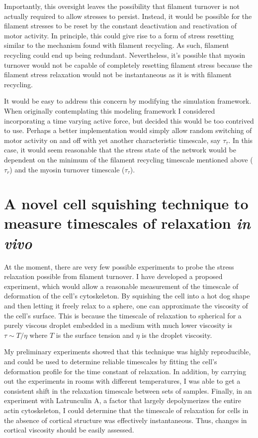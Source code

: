Importantly, this oversight leaves the possibility that filament turnover is not actually required to allow stresses to persist.  Instead, it would be possible for the filament stresses to be reset by the constant deactivation and reactivation of motor activity.  In principle, this could give rise to a form of stress resetting similar to the mechanism found with filament recycling.  As such, filament recycling could end up being redundant.  Nevertheless, it's possible that myosin turnover would not be capable of completely resetting filament stress because the filament stress relaxation would not be instantaneous as it is with filament recycling.

It would be easy to address this concern by modifying the simulation framework.  When originally contemplating this modeling framework I considered incorporating a time varying active force, but decided this would be too contrived to use.  Perhaps a better implementation would simply allow random switching of motor activity on and off with yet another characteristic timescale, say $\tau_\tau$.  In this case, it would seem reasonable that the stress state of the network would be dependent on the minimum of the filament recycling timescale mentioned above ($\tau_r$) and the myosin turnover timescale ($\tau_\tau$).



\section{A novel cell squishing technique to measure timescales of relaxation \textit{in vivo}}

At the moment, there are very few possible experiments to probe the stress relaxation possible from filament turnover.  I have developed a proposed experiment, which would allow a reasonable measurement of the timescale of deformation of the cell's cytoskeleton.  By squishing the cell into a hot dog shape and then letting it freely relax to a sphere, one can approximate the viscosity of the cell's surface.  This is because the timescale of relaxation to spherical for a purely viscous droplet embedded in a medium with much lower viscosity is $\tau \sim T/\eta$ where $T$ is the surface tension and $\eta$ is the droplet viscosity.  

My preliminary experiments showed that this technique was highly reproducible, and could be used to determine reliable timescales by fitting the cell's deformation profile for the time constant of relaxation.  In addition, by carrying out the experiments in rooms with different temperatures, I was able to get a consistent shift in the relaxation timescale between sets of samples.  Finally, in an experiment with Latrunculin A, a factor that largely depolymerizes the entire actin cytoskeleton, I could determine that the timescale of relaxation for cells in the absence of cortical structure was effectively instantaneous.  Thus, changes in cortical viscosity should be easily assessed.  


